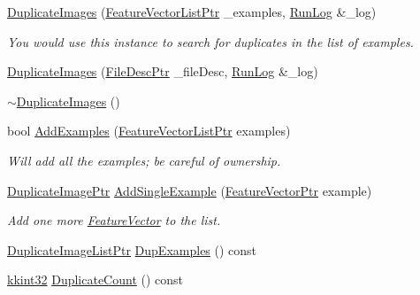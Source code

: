 \begin{DoxyCompactItemize}
\item 
\hyperlink{class_k_k_m_l_l_1_1_duplicate_images_a59e1b472cf4a32cdbeddd35311d9742c}{Duplicate\+Images} (\hyperlink{namespace_k_k_m_l_l_acf2ba92a3cf03e2b19674b24ff488ef6}{Feature\+Vector\+List\+Ptr} \+\_\+examples, \hyperlink{class_k_k_b_1_1_run_log}{Run\+Log} \&\+\_\+log)
\begin{DoxyCompactList}\small\item\em You would use this instance to search for duplicates in the list of \textquotesingle{}examples\textquotesingle{}. \end{DoxyCompactList}\item 
\hyperlink{class_k_k_m_l_l_1_1_duplicate_images_a45f6683a4e60476e95b7178f68a90d14}{Duplicate\+Images} (\hyperlink{namespace_k_k_m_l_l_aa0d0b6ab4ec18868a399b8455b05d914}{File\+Desc\+Ptr} \+\_\+file\+Desc, \hyperlink{class_k_k_b_1_1_run_log}{Run\+Log} \&\+\_\+log)
\item 
\hyperlink{class_k_k_m_l_l_1_1_duplicate_images_a10512caf300eb9716dbb502ce7163f34}{$\sim$\+Duplicate\+Images} ()
\item 
bool \hyperlink{class_k_k_m_l_l_1_1_duplicate_images_a5e14841952f86c8baadef32fc10f99ab}{Add\+Examples} (\hyperlink{namespace_k_k_m_l_l_acf2ba92a3cf03e2b19674b24ff488ef6}{Feature\+Vector\+List\+Ptr} examples)
\begin{DoxyCompactList}\small\item\em Will add all the examples; be careful of ownership. \end{DoxyCompactList}\item 
\hyperlink{namespace_k_k_m_l_l_a55d6f703b6c805f96dc6af66f31d2be5}{Duplicate\+Image\+Ptr} \hyperlink{class_k_k_m_l_l_1_1_duplicate_images_a3cee9fd28e260d337c6c37e683bdda1d}{Add\+Single\+Example} (\hyperlink{namespace_k_k_m_l_l_a0c5df3d48f45926fbc4fee04f5e3bc04}{Feature\+Vector\+Ptr} example)
\begin{DoxyCompactList}\small\item\em Add one more \hyperlink{class_k_k_m_l_l_1_1_feature_vector}{Feature\+Vector} to the list. \end{DoxyCompactList}\item 
\hyperlink{namespace_k_k_m_l_l_a0d6bd9e8744f7f256c866b6d88739d23}{Duplicate\+Image\+List\+Ptr} \hyperlink{class_k_k_m_l_l_1_1_duplicate_images_a63a339b4fe4a6626d30ca55438b4e24c}{Dup\+Examples} () const 
\item 
\hyperlink{namespace_k_k_b_a8fa4952cc84fda1de4bec1fbdd8d5b1b}{kkint32} \hyperlink{class_k_k_m_l_l_1_1_duplicate_images_a5bc64ab7f75f846b307919c7566d4d6d}{Duplicate\+Count} () const 

\end{DoxyCompactItemize}
